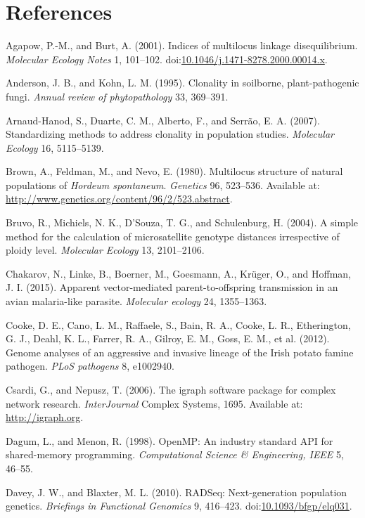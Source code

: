 \documentclass{frontiersSCNS} %
\begin{document}
\section*{References}\label{references}

Agapow, P.-M., and Burt, A. (2001). Indices of multilocus linkage
disequilibrium. \emph{Molecular Ecology Notes} 1, 101--102.
doi:\href{http://dx.doi.org/10.1046/j.1471-8278.2000.00014.x}{10.1046/j.1471-8278.2000.00014.x}.

Anderson, J. B., and Kohn, L. M. (1995). Clonality in soilborne,
plant-pathogenic fungi. \emph{Annual review of phytopathology} 33,
369--391.

Arnaud-Hanod, S., Duarte, C. M., Alberto, F., and Serr{\~{a}}o, E. A.
(2007). Standardizing methods to address clonality in population
studies. \emph{Molecular Ecology} 16, 5115--5139.

Brown, A., Feldman, M., and Nevo, E. (1980). Multilocus structure of
natural populations of \emph{Hordeum spontaneum}. \emph{Genetics} 96,
523--536. Available at:
\url{http://www.genetics.org/content/96/2/523.abstract}.

Bruvo, R., Michiels, N. K., D'Souza, T. G., and Schulenburg, H. (2004).
A simple method for the calculation of microsatellite genotype distances
irrespective of ploidy level. \emph{Molecular Ecology} 13, 2101--2106.

Chakarov, N., Linke, B., Boerner, M., Goesmann, A., Kr{\"{u}}ger, O., and
Hoffman, J. I. (2015). Apparent vector-mediated parent-to-offspring
transmission in an avian malaria-like parasite. \emph{Molecular ecology}
24, 1355--1363.

Cooke, D. E., Cano, L. M., Raffaele, S., Bain, R. A., Cooke, L. R.,
Etherington, G. J., Deahl, K. L., Farrer, R. A., Gilroy, E. M., Goss, E.
M., et al. (2012). Genome analyses of an aggressive and invasive lineage
of the Irish potato famine pathogen. \emph{PLoS pathogens} 8, e1002940.

Csardi, G., and Nepusz, T. (2006). The igraph software package for
complex network research. \emph{InterJournal} Complex Systems, 1695.
Available at: \url{http://igraph.org}.

Dagum, L., and Menon, R. (1998). OpenMP: An industry standard API for
shared-memory programming. \emph{Computational Science \& Engineering,
IEEE} 5, 46--55.

Davey, J. W., and Blaxter, M. L. (2010). RADSeq: Next-generation
population genetics. \emph{Briefings in Functional Genomics} 9,
416--423.
doi:\href{http://dx.doi.org/10.1093/bfgp/elq031}{10.1093/bfgp/elq031}.
\end{document}
